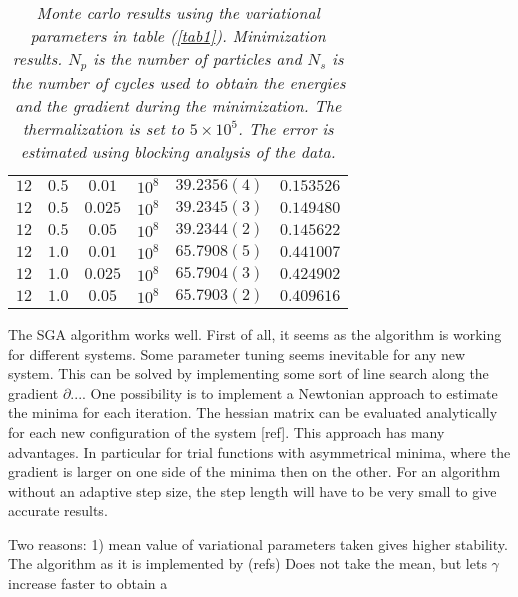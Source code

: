 \documentclass[a4paper,10pt,twocolumn]{article} %
\begin{document}
\begin{table}
\begin{center}
\begin{tabular}{|c|c|c|c|c|c|}
 $12$ & $0.5$ & $0.01$  & $10^8$ & $39.2356(4)$ & $0.153526$ \\ 
 $12$ & $0.5$ & $0.025$ & $10^8$ & $39.2345(3)$ & $0.149480$ \\ 
 $12$ & $0.5$ & $0.05$  & $10^8$ & $39.2344(2)$ & $0.145622$ \\ 
\hline
 $12$ & $1.0$ & $0.01$  & $10^8$ & $65.7908(5)$ & $0.441007$ \\ 
 $12$ & $1.0$ & $0.025$ & $10^8$ & $65.7904(3)$ & $0.424902$ \\ 
 $12$ & $1.0$ & $0.05$  & $10^8$ & $65.7903(2)$ & $0.409616$ \\ 
\hline
\end{tabular}
\end{center}
\caption{{\it 
	Monte carlo results using the variational parameters in table (\ref{tab1}).
	Minimization results. $N_p$ is the number of particles and $N_s$ is the number of cycles used to obtain the energies and the gradient during the minimization.
	The thermalization is set to $5\times 10^5$. The error is estimated using blocking analysis of the data. 
}}
\label{tab2}
\end{table}

The SGA algorithm works well. First of all, it seems as the algorithm is working for different systems. Some parameter tuning seems inevitable for any new system. This can be solved by implementing
some sort of line search along the gradient $\partial ...$. One possibility is to implement a Newtonian approach to estimate the minima for each iteration. The hessian matrix can be evaluated 
analytically for each new configuration of the system [ref]. This approach has many advantages. In particular for trial functions with asymmetrical minima, 
where the gradient is larger on one side of the minima then on the other. For an algorithm without an adaptive step size, the step length will have to be very small to give accurate results.


Two reasons: 1) mean value of variational parameters taken gives higher stability.
The algorithm as it is implemented by (refs) Does not take the mean, but lets $\gamma$ increase faster to obtain a 

\end{document}
